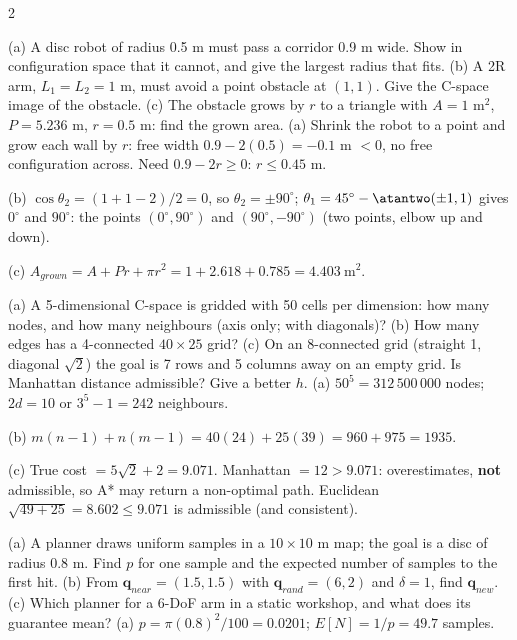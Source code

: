 \begin{multicols}{2}
\begin{examq}
\end{examq}
\begin{examq}
(a) A disc robot of radius 0.5 m must pass a corridor 0.9 m wide. Show in configuration space that it cannot, and give the largest radius that fits. (b) A 2R arm, $L_1=L_2=1$ m, must avoid a point obstacle at $(1,1)$. Give the C-space image of the obstacle. (c) The obstacle grows by $r$ to a triangle with $A=1$ m$^2$, $P=5.236$ m, $r=0.5$ m: find the grown area.
\solution
(a) Shrink the robot to a point and grow each wall by $r$: free width $0.9-2(0.5)=-0.1$ m $<0$, no free configuration across. Need $0.9-2r\ge0$: $r\le0.45$ m. \par
(b) $\cos\theta_2=(1+1-2)/2=0$, so $\theta_2=\pm90^\circ$; $\theta_1=45^\circ-\atantwo(\pm1,1)$ gives $0^\circ$ and $90^\circ$: the points $(0^\circ,90^\circ)$ and $(90^\circ,-90^\circ)$ (two points, elbow up and down). \par
(c) $A_{grown}=A+Pr+\pi r^2=1+2.618+0.785=\boxed{4.403\ \text{m}^2}$. \ \chk
\end{examq}
\begin{examq}
(a) A 5-dimensional C-space is gridded with 50 cells per dimension: how many nodes, and how many neighbours (axis only; with diagonals)? (b) How many edges has a 4-connected $40\times25$ grid? (c) On an 8-connected grid (straight 1, diagonal $\sqrt2$) the goal is 7 rows and 5 columns away on an empty grid. Is Manhattan distance admissible? Give a better $h$.
\solution
(a) $50^5=312\,500\,000$ nodes; $2d=10$ or $3^5-1=242$ neighbours. \par
(b) $m(n-1)+n(m-1)=40(24)+25(39)=960+975=\boxed{1935}$. \par
(c) True cost $=5\sqrt2+2=9.071$. Manhattan $=12>9.071$: overestimates, \textbf{not} admissible, so A* may return a non-optimal path. Euclidean $\sqrt{49+25}=8.602\le9.071$ is admissible (and consistent). \ \chk
\end{examq}
\begin{examq}
(a) A planner draws uniform samples in a $10\times10$ m map; the goal is a disc of radius 0.8 m. Find $p$ for one sample and the expected number of samples to the first hit. (b) From $\mathbf q_{near}=(1.5,1.5)$ with $\mathbf q_{rand}=(6,2)$ and $\delta=1$, find $\mathbf q_{new}$. (c) Which planner for a 6-DoF arm in a static workshop, and what does its guarantee mean?
\solution
(a) $p=\pi(0.8)^2/100=0.0201$; $E[N]=1/p=49.7$ samples. \par

\end{examq}
\end{multicols}
